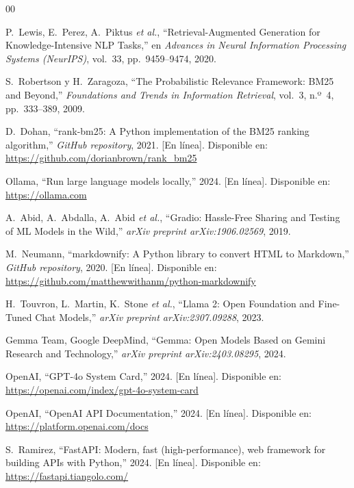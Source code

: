 \documentclass[conference]{IEEEtran}
\begin{document}
\begin{thebibliography}{00}

P.~Lewis, E.~Perez, A.~Piktus \textit{et al.},
``Retrieval-Augmented Generation for Knowledge-Intensive NLP Tasks,''
en \textit{Advances in Neural Information Processing Systems (NeurIPS)},
vol.~33, pp.~9459--9474, 2020.

S.~Robertson y H.~Zaragoza,
``The Probabilistic Relevance Framework: BM25 and Beyond,''
\textit{Foundations and Trends in Information Retrieval},
vol.~3, n.º~4, pp.~333--389, 2009.

D.~Dohan,
``rank-bm25: A Python implementation of the BM25 ranking algorithm,''
\textit{GitHub repository}, 2021.
[En línea]. Disponible en: \url{https://github.com/dorianbrown/rank_bm25}

Ollama,
``Run large language models locally,''
2024.
[En línea]. Disponible en: \url{https://ollama.com}

A.~Abid, A.~Abdalla, A.~Abid \textit{et al.},
``Gradio: Hassle-Free Sharing and Testing of ML Models in the Wild,''
\textit{arXiv preprint arXiv:1906.02569}, 2019.

M.~Neumann,
``markdownify: A Python library to convert HTML to Markdown,''
\textit{GitHub repository}, 2020.
[En línea]. Disponible en: \url{https://github.com/matthewwithanm/python-markdownify}

H.~Touvron, L.~Martin, K.~Stone \textit{et al.},
``Llama 2: Open Foundation and Fine-Tuned Chat Models,''
\textit{arXiv preprint arXiv:2307.09288}, 2023.

Gemma Team, Google DeepMind,
``Gemma: Open Models Based on Gemini Research and Technology,''
\textit{arXiv preprint arXiv:2403.08295}, 2024.

OpenAI,
``GPT-4o System Card,''
2024.
[En línea]. Disponible en: \url{https://openai.com/index/gpt-4o-system-card}

OpenAI,
``OpenAI API Documentation,''
2024.
[En línea]. Disponible en: \url{https://platform.openai.com/docs}

S.~Ramirez,
``FastAPI: Modern, fast (high-performance), web framework for building
APIs with Python,''
2024.
[En línea]. Disponible en: \url{https://fastapi.tiangolo.com/}


\end{thebibliography}
\end{document}
